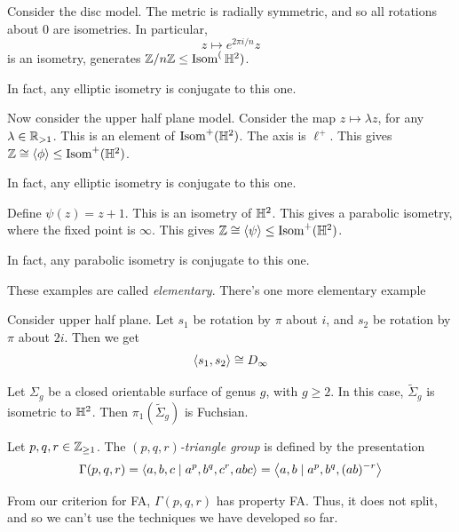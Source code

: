 \documentclass{article}
\begin{document}
\begin{example}
    Consider the disc model. The metric is radially symmetric, and so all rotations about \(0\) are isometries. In particular,
    \[z \mapsto e^{2\pi i/n}z\]
    is an isometry, generates \(\mathbb{Z}/n\mathbb{Z} \le \operatorname{Isom}^(\mathbb{H}^2)\).

    In fact, any elliptic isometry is conjugate to this one.
\end{example}

\begin{example}
    Now consider the upper half plane model. Consider the map \(z \mapsto \lambda z\), for any \(\lambda \in \mathbb{R}_{> 1}\). This is an element of \(\operatorname{Isom}^+(\mathbb{H}^2)\). The axis is \(\ell^+\). This gives \(\mathbb{Z} \cong \left\langle \phi \right\rangle \le \operatorname{Isom}^+(\mathbb{H}^2)\).

    In fact, any elliptic isometry is conjugate to this one.
\end{example}

\begin{example}
    Define \(\psi(z) = z + 1\). This is an isometry of \(\mathbb{H}^2\). This gives a parabolic isometry, where the fixed point is \(\infty\). This gives \(\mathbb{Z} \cong \left\langle \psi \right\rangle \le \operatorname{Isom}^+(\mathbb{H}^2)\).

    In fact, any parabolic isometry is conjugate to this one.
\end{example}

These examples are called \emph{elementary}. There's one more elementary example

\begin{example}
    Consider upper half plane. Let \(s_1\) be rotation by \(\pi\) about \(i\), and \(s_2\) be rotation by \(\pi\) about \(2i\). Then we get
    \[\left\langle s_1, s_2 \right\rangle \cong D_\infty\]
\end{example}

\begin{example}
    Let \(\Sigma_g\) be a closed orientable surface of genus \(g\), with \(g \ge 2\). In this case, \(\widetilde \Sigma_g\) is isometric to \(\mathbb{H}^2\). Then \(\pi_1(\widetilde \Sigma_g)\) is Fuchsian.
\end{example}

\begin{definition}
    Let \(p, q, r \in \mathbb{Z}_{\ge 1}\). The \emph{\((p,q,r)\)-triangle group} is defined by the presentation
    \[\Gamma(p,q,r) = \left\langle a,b,c \mid a^p, b^q, c^r, abc \right\rangle = \left\langle a, b \mid a^p, b^q, (ab)^{-r} \right\rangle\]
\end{definition}

From our criterion for FA, \(\Gamma(p, q, r)\) has property FA. Thus, it does not split, and so we can't use the techniques we have developed so far.
\end{document}
